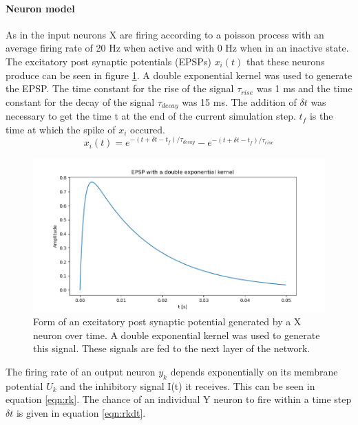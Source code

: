 \paragraph{Neuron model}

As in \citet{nessler} the input neurons X are firing according to a poisson process with an average firing rate of 20 Hz when active and with 0 Hz when in an inactive state. The excitatory post synaptic potentials (EPSPs) $x_i(t)$ that these neurons produce can be seen in figure \ref{fig:XSpike}. A double exponential kernel was used to generate the EPSP. The time constant for the rise of the signal $\tau_{rise}$ was 1 ms and the time constant for the decay of the signal $\tau_{decay}$ was 15 ms. The addition of $\delta t$ was necessary to get the time t at the end of the current simulation step. $t_f$ is the time at which the spike of $x_i$ occured.
\begin{equation}
\label{eqn:EPSP}
x_i(t) = e^{-(t + \delta t - t_f) / \tau_{decay}} - e^{-(t + \delta t - t_f) / \tau_{rise}}
\end{equation}


\begin{figure}
  \includegraphics[width=\linewidth]{figures/XSpike.png}
  \caption{Form of an excitatory post synaptic potential generated by a X neuron over time. A double exponential kernel was used to generate this signal. These signals are fed to the next layer of the network. }
  \label{fig:XSpike}
\end{figure}

The firing rate of an output neuron $y_k$ depends exponentially on its membrane potential $U_k$ and the inhibitory signal I(t) it receives. This can be seen in equation \ref{eqn:rk}. The chance of an individual Y neuron to fire within a time step $\delta t$ is given in equation \ref{eqn:rkdt}.

